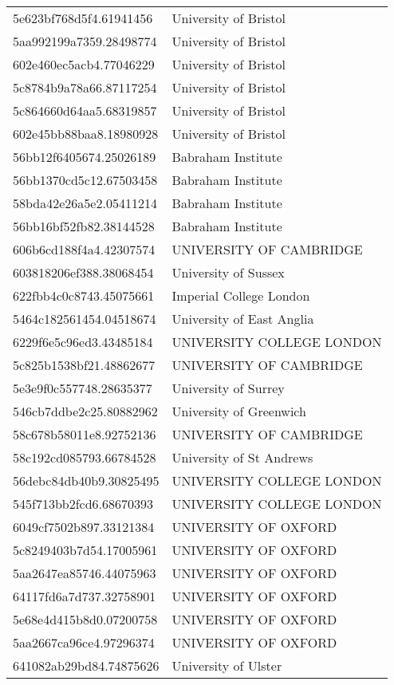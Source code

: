 \begin{tabular}{ll}
5e623bf768d5f4.61941456 & University of Bristol \\
5aa992199a7359.28498774 & University of Bristol \\
602e460ec5acb4.77046229 & University of Bristol \\
5c8784b9a78a66.87117254 & University of Bristol \\
5c864660d64aa5.68319857 & University of Bristol \\
602e45bb88baa8.18980928 & University of Bristol \\
56bb12f6405674.25026189 & Babraham Institute \\
56bb1370cd5c12.67503458 & Babraham Institute \\
58bda42e26a5e2.05411214 & Babraham Institute \\
56bb16bf52fb82.38144528 & Babraham Institute \\
606b6cd188f4a4.42307574 & UNIVERSITY OF CAMBRIDGE \\
603818206ef388.38068454 & University of Sussex \\
622fbb4c0c8743.45075661 & Imperial College London \\
5464c182561454.04518674 & University of East Anglia \\
6229f6e5c96ed3.43485184 & UNIVERSITY COLLEGE LONDON \\
5c825b1538bf21.48862677 & UNIVERSITY OF CAMBRIDGE \\
5e3e9f0c557748.28635377 & University of Surrey \\
546cb7ddbe2c25.80882962 & University of Greenwich \\
58c678b58011e8.92752136 & UNIVERSITY OF CAMBRIDGE \\
58c192cd085793.66784528 & University of St Andrews \\
56debc84db40b9.30825495 & UNIVERSITY COLLEGE LONDON \\
545f713bb2fcd6.68670393 & UNIVERSITY COLLEGE LONDON \\
6049cf7502b897.33121384 & UNIVERSITY OF OXFORD \\
5c8249403b7d54.17005961 & UNIVERSITY OF OXFORD \\
5aa2647ea85746.44075963 & UNIVERSITY OF OXFORD \\
64117fd6a7d737.32758901 & UNIVERSITY OF OXFORD \\
5e68e4d415b8d0.07200758 & UNIVERSITY OF OXFORD \\
5aa2667ca96ce4.97296374 & UNIVERSITY OF OXFORD \\
641082ab29bd84.74875626 & University of Ulster \\

\end{tabular}
